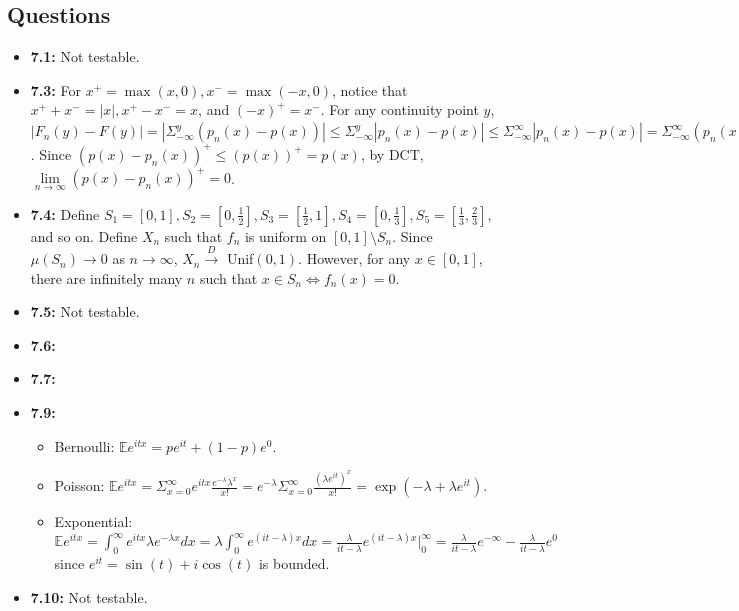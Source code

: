 \documentclass[12pt]{article}
\newcommand{\E}{\mathbb{E}}
\begin{document}
\subsection*{Questions}
\begin{itemize}
    \item \textbf{7.1:} Not testable.
    \item \textbf{7.3:} For $x^+ = \max(x,0), x^- = \max(-x,0)$, notice that $x^+ + x^- = |x|, x^+ - x^- = x$, and $(-x)^+ = x^-$. For any continuity point $y$, $|F_n(y) - F(y)| = |\Sigma_{-\infty}^y (p_n(x) - p(x))| \leq \Sigma_{-\infty}^y |p_n(x) - p(x)| \leq \Sigma_{-\infty}^\infty |p_n(x) - p(x)| = \Sigma_{-\infty}^\infty (p_n(x) - p(x))^+ + \Sigma_{-\infty}^\infty (p_n(x) - p(x))^- = \Sigma_{-\infty}^\infty [p_n(x) - p(x) + (p_n(x) - p(x))^-] + \Sigma_{-\infty}^\infty (p_n(x) - p(x))^- = 2\Sigma_{-\infty}^\infty (p_n(x) - p(x))^- = \Sigma_{-\infty}^\infty (p(x) - p_n(x))^+$. Since $(p(x) - p_n(x))^+ \leq (p(x))^+ = p(x)$, by DCT, $\lim \limits_{n\to\infty} (p(x) - p_n(x))^+ = 0$.
    \item \textbf{7.4:} Define $S_1 = [0,1], S_2 = [0,\frac{1}{2}], S_3 = [\frac{1}{2},1], S_4 = [0, \frac{1}{3}], S_5 = [\frac{1}{3}, \frac{2}{3}]$, and so on. Define $X_n$ such that $f_n$ is uniform on $[0,1] \setminus S_n$. Since $\mu(S_n) \to 0$ as $n \to \infty$, $X_n \overset{D}{\to}$ Unif$(0,1)$. However, for any $x \in [0,1]$, there are infinitely many $n$ such that $x \in S_n \iff f_n(x) = 0$.
    \item \textbf{7.5:} Not testable.
    \item \textbf{7.6:}
    \item \textbf{7.7:}
    \item \textbf{7.9:}
    \begin{itemize}
        \item Bernoulli: $\E e^{itx} = pe^{it} + (1-p)e^0$.
        \item Poisson: $\E e^{itx} = \Sigma_{x=0}^\infty e^{itx}\frac{e^{-\lambda}\lambda^x}{x!} = e^{-\lambda} \Sigma_{x=0}^\infty \frac{(\lambda e^{it})^x}{x!} = \exp(-\lambda + \lambda e^{it})$.
        \item Exponential: $\E e^{itx} = \int_0^\infty e^{itx}\lambda e^{-\lambda x}dx = \lambda \int_0^\infty e^{(it-\lambda)x}dx = \frac{\lambda}{it-\lambda} e^{(it-\lambda)x}|_0^\infty = \frac{\lambda}{it-\lambda} e^{-\infty} - \frac{\lambda}{it-\lambda} e^0$ since $e^{it} = \sin(t)+i\cos(t)$ is bounded.
    \end{itemize}
    \item \textbf{7.10:} Not testable.
\end{itemize}
\end{document}

